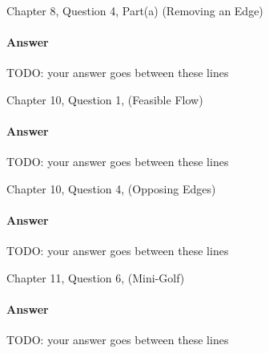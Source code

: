 \documentclass{article}
\begin{document}
Chapter 8, Question 4, Part(a) (Removing an Edge)

\paragraph{Answer}


TODO: your answer goes between these lines


\nextprob
{}

Chapter 10, Question 1, (Feasible Flow)

\paragraph{Answer}


TODO: your answer goes between these lines



\nextprob
{}

Chapter 10, Question 4, (Opposing Edges)

\paragraph{Answer}


TODO: your answer goes between these lines


\nextprob
{}

Chapter 11, Question 6, (Mini-Golf)

\paragraph{Answer}


TODO: your answer goes between these lines


\nextprob
{}
\end{document}
